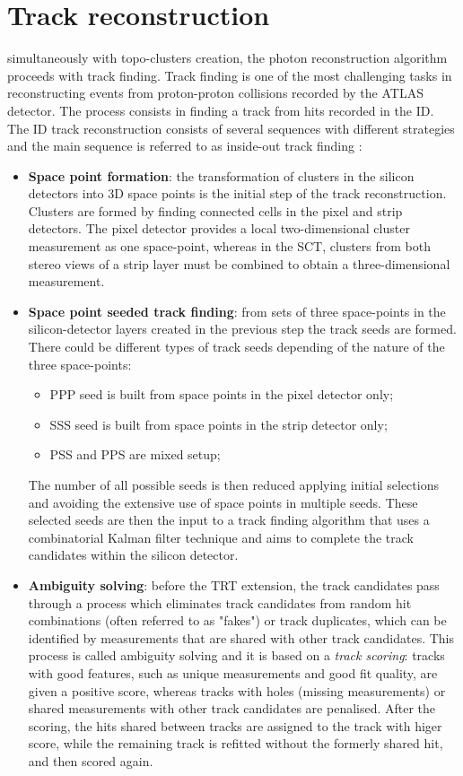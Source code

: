 \documentclass[a4paper, oneside, 11pt, openright]{book}
\begin{document}
		\section{Track reconstruction}
			simultaneously with topo-clusters creation, the photon reconstruction algorithm proceeds with track finding. Track finding is one of the most challenging tasks in reconstructing events from proton-proton  collisions  recorded  by  the  ATLAS  detector. The process consists in finding a track from hits recorded in the ID. The ID track reconstruction consists of several sequences with different strategies and the main sequence is referred to as inside-out track finding \cite{ID_track1}: 
			\begin{itemize}
				\item \textbf{Space point formation}: the transformation of clusters in the silicon detectors into 3D space points is the initial step of the track reconstruction.  Clusters are formed by finding connected cells in the pixel and strip detectors. The pixel detector provides a local two-dimensional cluster measurement as one space-point, whereas in the SCT, clusters from both stereo views of a strip layer must be combined to obtain a three-dimensional measurement.

				\item \textbf{Space point seeded track finding}: from sets of three space-points in the silicon-detector layers created in the previous step the track seeds are formed. There could be different types of track seeds depending of the nature of the three space-points: 
				\begin{itemize}
					\item PPP seed is built from space points in the pixel detector only;
					\item SSS seed is built from space points in the strip detector only;
					\item PSS and PPS are mixed setup;
				\end{itemize}
				The number of all possible seeds is then reduced applying initial selections and avoiding the extensive use of space points in multiple seeds. These selected seeds are then the input to a track finding algorithm that uses a combinatorial Kalman filter technique \cite{Kalman} and aims to complete the track candidates within the silicon detector.
				
				\item \textbf{Ambiguity solving}: before the TRT extension, the track candidates pass through a process which eliminates track candidates from random hit combinations (often referred to as "fakes") or track duplicates, which can be identified by measurements that are shared with other track candidates. This process is called ambiguity solving and it is based on a \textit{track scoring}: tracks with good features, such as unique measurements and good fit quality, are given a positive score, whereas tracks with holes (missing measurements) or shared measurements with other track candidates are penalised. After the scoring, the hits shared between tracks are assigned to the track with higer score, while the remaining track is refitted without the formerly shared hit, and then scored again.
				

\end{itemize}
\end{document}
